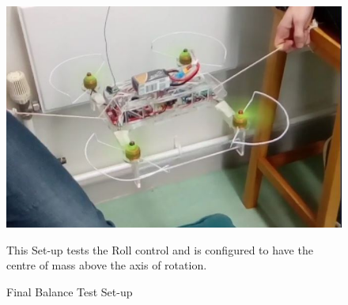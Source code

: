 \documentclass[a4paper,11pt]{article}
\begin{document}
\begin{figure}[!ht]
    \includegraphics[width=\textwidth]{final_balance.jpg}
    \caption{Final Balance Test Set-up}
    \medskip
    \small
    \centering
    This Set-up tests the Roll control and is configured to have the centre of mass above the axis of rotation.
    \label{fig:Final Balance}
\end{figure}


  
\end{document}
